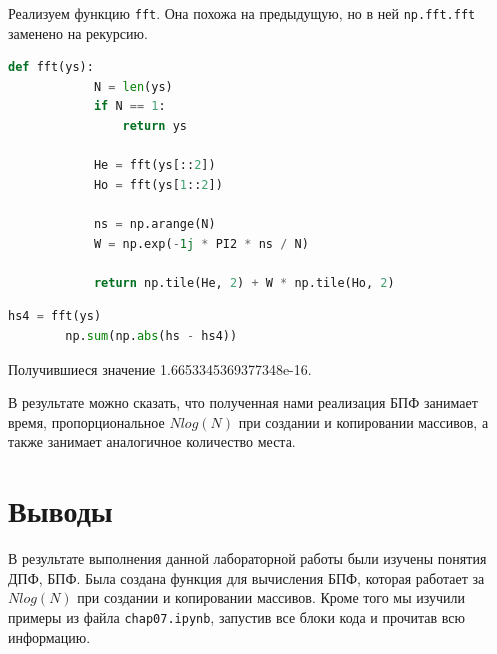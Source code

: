 \documentclass[a4paper, 14pt]{extarticle}
\begin{document}
    Реализуем функцию \texttt{fft}.
    Она похожа на предыдущую, но в ней \texttt{np.fft.fft} заменено на рекурсию.

    \begin{lstlisting}[language=Python, caption= Функция fft, label={lst:fft}]
        def fft(ys):
            N = len(ys)
            if N == 1:
                return ys

            He = fft(ys[::2])
            Ho = fft(ys[1::2])

            ns = np.arange(N)
            W = np.exp(-1j * PI2 * ns / N)

            return np.tile(He, 2) + W * np.tile(Ho, 2)
    \end{lstlisting}

    \begin{lstlisting}[language=Python, caption= Использование fft, label={lst:call_fft}]
        hs4 = fft(ys)
        np.sum(np.abs(hs - hs4))
    \end{lstlisting}

    Получившиеся значение 1.6653345369377348e-16.

    В результате можно сказать, что полученная нами реализация БПФ занимает время, пропорциональное \texttt{\(Nlog(N)\)} при создании и копировании массивов, а также занимает аналогичное количество места.

    \newpage


    \section{Выводы}
    \label{sec:conclusions}

    В результате выполнения данной лабораторной работы были изучены понятия ДПФ, БПФ.
    Была создана функция для вычисления БПФ, которая работает за \texttt{\(Nlog(N)\)} при создании и копировании массивов.
    Кроме того мы изучили примеры из файла \texttt{chap07.ipynb}, запустив все блоки кода и прочитав всю информацию.
\end{document}

